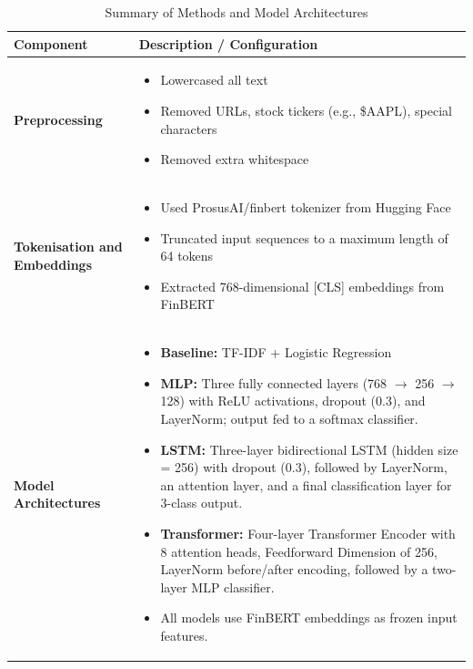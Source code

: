 \documentclass[english]{article}
\begin{document}
\begin{table}[H]
\centering
\caption{Summary of Methods and Model Architectures}
\label{extended_methods}
\renewcommand{\arraystretch}{2.6}  
\begin{tabularx}{\textwidth}{@{} l X @{}}
\toprule
\textbf{Component} & \textbf{Description / Configuration} \\

\midrule

\textbf{Preprocessing} & 
\begin{itemize}
    \vspace{-1em}
    \item Lowercased all text
    \item Removed URLs, stock tickers (e.g., \$AAPL), special characters
    \item Removed extra whitespace
\end{itemize} \\

\midrule

\textbf{Tokenisation and Embeddings} &
\begin{itemize}
    \vspace{-1em}
    \item Used ProsusAI/finbert\cite{ProsusAI2023-yv} tokenizer from Hugging Face
    \item Truncated input sequences to a maximum length of 64 tokens
    \item Extracted 768-dimensional [CLS] embeddings from FinBERT
\end{itemize} \\

\midrule

\textbf{Model Architectures} &
\begin{itemize}
    \vspace{-1em}
    \item \textbf{Baseline:} TF-IDF + Logistic Regression
    \item \textbf{MLP:} Three fully connected layers (768 $\rightarrow$ 256 $\rightarrow$ 128) with ReLU activations, dropout (0.3), and LayerNorm; output fed to a softmax classifier.
    \item \textbf{LSTM:} Three-layer bidirectional LSTM (hidden size = 256) with dropout (0.3), followed by LayerNorm, an attention layer, and a final classification layer for 3-class output.
    \item \textbf{Transformer:} Four-layer Transformer Encoder with 8 attention heads, Feedforward Dimension of 256, LayerNorm before/after encoding, followed by a two-layer MLP classifier.
    \item All models use FinBERT embeddings as frozen input features.
\end{itemize} \\


\end{tabularx}
\end{table}
\end{document}
